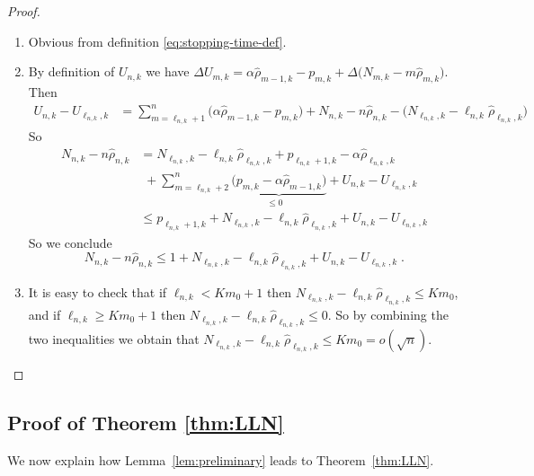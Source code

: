 \begin{proof}
	\begin{enumerate}[label=(\roman*)]
		\item Obvious from definition \eqref{eq:stopping-time-def}.
		\item By definition of \(U_{n,k}\) we have \(\Delta U_{m,k} = \alpha \hat{\rho}_{m-1,k} - p_{m,k} 
		+ \Delta \Big( N_{m,k} - m \hat{\rho}_{m,k} \Big)\).
%						
		Then 
		\begin{align*}
			U_{n,k} - U_{\ell_{n,k},k}
			&= \sum_{m=\ell_{n,k}+1}^n \Big( \alpha \hat{\rho}_{m-1,k} - p_{m,k} \Big)
			+ N_{n,k} - n \hat{\rho}_{n,k}
			- \Big( N_{\ell_{n,k},k} - \ell_{n,k} \hat{\rho}_{\ell_{n,k},k} \Big)
		\end{align*}
		So 
		\begin{align*}
			N_{n,k} - n \hat{\rho}_{n,k}
			&= N_{\ell_{n,k},k} - \ell_{n,k} \hat{\rho}_{\ell_{n,k},k}
			+ p_{\ell_{n,k}+1,k} - \alpha \hat{\rho}_{\ell_{n,k},k} \\&\,\,+ \sum_{m=\ell_{n,k}+2}^n \underbrace{\Big( p_{m,k} - \alpha \hat{\rho}_{m-1,k} \Big)}_{\leq 0 \quad}
			+ U_{n,k} - U_{\ell_{n,k}, k}\\					
			&\leq p_{\ell_{n,k}+1,k} + N_{\ell_{n,k},k} - \ell_{n,k} \hat{\rho}_{\ell_{n,k},k}
			+ U_{n,k} - U_{\ell_{n,k}, k}
		\end{align*}
		So we conclude 	
		\[N_{n,k} - n\hat{\rho}_{n,k} \leq 1 + N_{\ell_{n,k},k} - \ell_{n,k} \hat{\rho}_{\ell_{n,k},k} + U_{n,k} - U_{\ell_{n,k},k}\;.\]
		
		\item It is easy to check that if $\ell_{n,k} < K m_0+1$ then \(N_{\ell_{n,k},k} - \ell_{n,k} \hat{\rho}_{\ell_{n,k},k} \leq K m_0\),
		and if \(\ell_{n,k} \geq Km_0 + 1\) then \(N_{\ell_{n,k},k} - \ell_{n,k} \hat{\rho}_{\ell_{n,k},k} \leq 0\).
		So by combining the two inequalities we obtain that \(N_{\ell_{n,k},k} - \ell_{n,k} \hat{\rho}_{\ell_{n,k},k} \leq K m_0 = o(\sqrt{n})\)\;.
	\end{enumerate}
\end{proof}

\subsection{Proof of Theorem \ref{thm:LLN}}\label{proof:thm1}

We now explain how Lemma~\ref{lem:preliminary} leads to Theorem~\ref{thm:LLN}.

